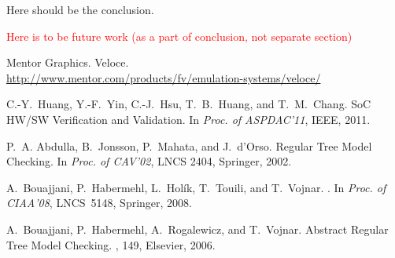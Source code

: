 \documentclass[draft]{llncs}
\newcommand{\notice}[1]{\textcolor{red}{#1}}
\begin{document}
Here should be the conclusion.

\notice{Here is to be future work (as a part of conclusion, not separate section)}



% 
% 

%

{
\begin{thebibliography}{10}



Mentor Graphics.
\newblock Veloce.\\
\newblock \url{http://www.mentor.com/products/fv/emulation-systems/veloce/}

C.-Y.~Huang, Y.-F.~Yin, C.-J.~Hsu, T.~B.~Huang, and T.~M.~Chang.
\newblock SoC HW/SW Verification and Validation.
\newblock In {\em Proc. of ASPDAC'11}, IEEE, 2011.

P.~A. Abdulla, B.~Jonsson, P.~Mahata, and J.~d'Orso.
\newblock Regular Tree Model Checking.
\newblock In {\em Proc. of CAV'02}, LNCS 2404, Springer, 2002.

A.~Bouajjani, P.~Habermehl, L.~Hol\'{i}k, T.~Touili, and T.~Vojnar.
.
\newblock In {\em Proc. of CIAA'08}, LNCS~5148, Springer, 2008.

A.~Bouajjani, P.~Habermehl, A.~Rogalewicz, and T.~Vojnar.
\newblock Abstract Regular Tree Model Checking.
, 149, Elsevier, 2006.

\end{thebibliography}
}

\end{document}
